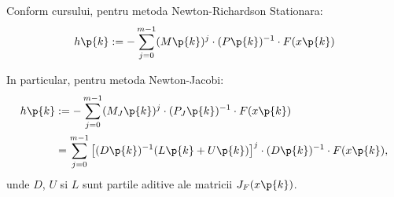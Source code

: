 \begin{demonstratie}

    Conform cursului, pentru metoda Newton-Richardson Stationara:
    $$ h\p{k} := - \sum_{j=0}^{m-1} (M\p{k})^j \cdot (P\p{k})^{-1} \cdot F(x\p{k}) $$

    In particular, pentru metoda Newton-Jacobi:
    \begin{align*}
        h\p{k} &:= - \sum_{j=0}^{m-1} (M_J\p{k})^j \cdot (P_J\p{k})^{-1} \cdot F(x\p{k}) \\
        &= \sum_{j=0}^{m-1} \left[ (D\p{k})^{-1} (L\p{k} + U\p{k}) \right]^j \cdot (D\p{k})^{-1} \cdot F(x\p{k}),
    \end{align*}
    unde $ D $, $ U $ si $ L $ sunt partile aditive ale matricii $ J_F (x\p{k})$.

\end{demonstratie}